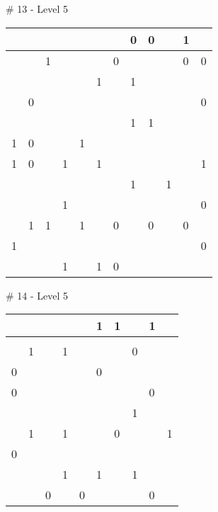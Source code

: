 \# 13 - Level 5 \newline
\begin{tabular}{|m{\collen}|m{\collen}|m{\collen}|m{\collen}|m{\collen}|m{\collen}|m{\collen}|m{\collen}|m{\collen}|m{\collen}|m{\collen}|m{\collen}|}
\hline
    &   &   &   &   &   &   & 0 & 0 &   & 1 &   \\
\hline
    &   & 1 &   &   &   & 0 &   &   &   & 0 & 0 \\
\hline
    &   &   &   &   & 1 &   & 1 &   &   &   &   \\
\hline
    & 0 &   &   &   &   &   &   &   &   &   & 0 \\
\hline
    &   &   &   &   &   &   & 1 & 1 &   &   &   \\
\hline
  1 & 0 &   &   & 1 &   &   &   &   &   &   &   \\
\hline
  1 & 0 &   & 1 &   & 1 &   &   &   &   &   & 1 \\
\hline
    &   &   &   &   &   &   & 1 &   & 1 &   &   \\
\hline
    &   &   & 1 &   &   &   &   &   &   &   & 0 \\
\hline
    & 1 & 1 &   & 1 &   & 0 &   & 0 &   & 0 &   \\
\hline
  1 &   &   &   &   &   &   &   &   &   &   & 0 \\
\hline
    &   &   & 1 &   & 1 & 0 &   &   &   &   &   \\
\hline
\end{tabular}


\medskip

\# 14 - Level 5 \newline
\begin{tabular}{|m{\collen}|m{\collen}|m{\collen}|m{\collen}|m{\collen}|m{\collen}|m{\collen}|m{\collen}|m{\collen}|m{\collen}|}
\hline
    &   &   &   &   & 1 & 1 &   & 1 &   \\
\hline
    &   &   &   &   &   &   &   &   &   \\
\hline
    & 1 &   & 1 &   &   &   & 0 &   &   \\
\hline
  0 &   &   &   &   & 0 &   &   &   &   \\
\hline
  0 &   &   &   &   &   &   &   & 0 &   \\
\hline
    &   &   &   &   &   &   & 1 &   &   \\
\hline
    & 1 &   & 1 &   &   & 0 &   &   & 1 \\
\hline
  0 &   &   &   &   &   &   &   &   &   \\
\hline
    &   &   & 1 &   & 1 &   & 1 &   &   \\
\hline
    &   & 0 &   & 0 &   &   &   & 0 &   \\
\hline
\end{tabular}


